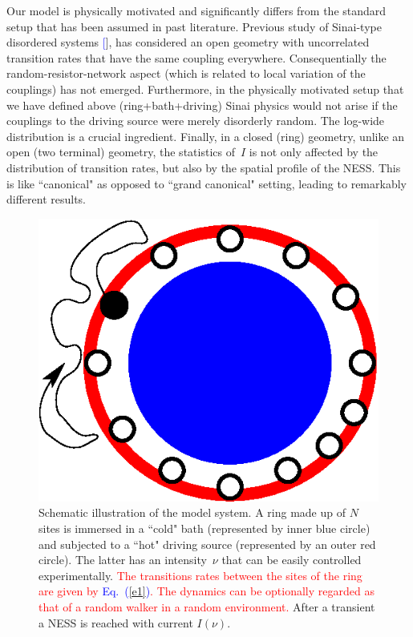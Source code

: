 \documentclass[aps,pre,floats,floatfix,twocolumn]{revtex4}
\newcommand{\Eq}[1]{\textcolor{blue}{Eq.\!\!~(\ref{#1})}}
\newcommand{\rmrk}[1]{\textcolor{red}{#1}}
\renewcommand{\cite}[1]{\textcolor{blue}{[\onlinecite{#1}}]} %
\begin{document}

Our model is physically motivated and significantly differs 
from the standard setup that has been assumed in past literature. 
Previous study of Sinai-type disordered systems \cite{sinai2}, 
has considered an open geometry with uncorrelated transition rates 
that have the same coupling everywhere. Consequentially 
the random-resistor-network aspect (which is related to local 
variation of the couplings) has not emerged.
%
Furthermore, in the physically motivated setup that we have 
defined above (ring+bath+driving) Sinai physics would not arise 
if the couplings to the driving source were merely disorderly random. 
The log-wide distribution is a crucial ingredient. 
%
Finally, in a closed (ring) geometry, unlike an open (two terminal) geometry, 
the statistics of~$I$ is not only affected by the distribution of transition rates, 
but also by the spatial profile of the NESS. 
This is like ``canonical" as opposed to ``grand canonical" setting, 
leading to remarkably different results.
 



\begin{figure}
\centering
\includegraphics[width=0.5\hsize]{nerRingModel}
\caption{
%
Schematic illustration of the model system.
%
A ring made up of $N$ sites is immersed in a ``cold" bath 
(represented by inner blue circle) 
and subjected to a ``hot" driving source
(represented by an outer red circle).
The latter has an intensity~$\nu$ 
that can be easily controlled experimentally. 
% 
\rmrk{The transitions rates between the sites 
of the ring are given by \Eq{e1}.  
The dynamics can be optionally regarded 
as that of a random walker in a random environment.} 
%
After a transient a NESS is reached with current $I(\nu)$.   
} 
\label{f0}
\end{figure}
\end{document}
